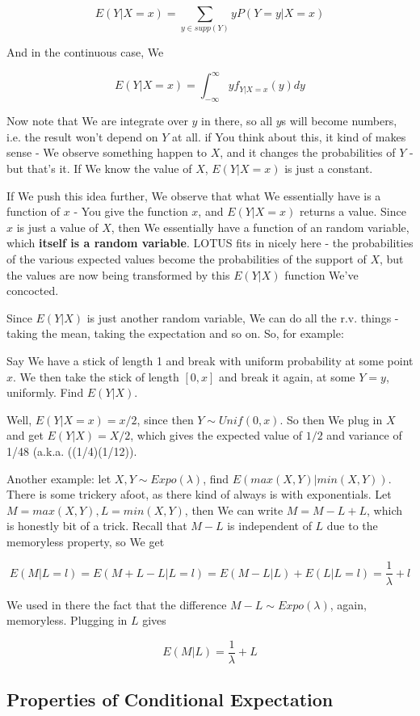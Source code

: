 \documentclass{article}
\begin{document}
		\[ E(Y|X=x) = \sum_{y\in supp(Y)} y P(Y=y|X=x) \]
		
		And in the continuous case, We 

		\[ E(Y|X=x) = \int^\infty_{-\infty} y f_{Y|X=x}(y) dy \]
		
		Now note that We are integrate over $y$ in there, so all $y$s will become numbers, i.e. the result won't depend on $Y$ at all. if You think about this, it kind of makes sense - We observe something happen to $X$, and it changes the probabilities of $Y$ - but that's it. If We know the value of $X$, $E(Y|X=x)$ is just a constant.
		
		If We push this idea further, We observe that what We essentially have is a function of $x$ - You give the function $x$, and $E(Y|X=x)$ returns a value. Since $x$ is just a value of $X$, then We essentially have a function of an random variable, which \textbf{itself is a random variable}. LOTUS fits in nicely here - the probabilities of the various expected values become the probabilities of the support of $X$, but the values are now being transformed by this $E(Y|X)$ function We've concocted.
		
		Since $E(Y|X)$ is just another random variable, We can do all the r.v. things - taking the mean, taking the expectation and so on. So, for example:

		Say We have a stick of length 1 and break with uniform probability at some point $x$. We then take the stick of length $[0, x]$ and break it again, at some $Y=y$, uniformly. Find $E(Y|X)$.
		
		Well, $E(Y|X=x) = x/2$, since then $Y\sim Unif(0, x)$. So then We plug in $X$ and get $E(Y|X) = X/2$, which gives the expected value of $1/2$ and variance of 1/48 (a.k.a. ((1/4)(1/12)).
		
		Another example: let $X, Y\sim Expo(\lambda)$, find $E(max(X, Y)|min(X, Y))$. There is some trickery afoot, as there kind of always is with exponentials. Let $M=max(X, Y), L=min(X, Y)$, then We can write $M = M-L+L$, which is honestly bit of a trick. Recall that $M-L$ is independent of $L$ due to the memoryless property, so We get
		
		\[ E(M|L=l) = E(M+L-L|L=l) = E(M-L|L) + E(L|L=l) = \frac{1}{\lambda} + l  \]

		We used in there the fact that the difference $M-L\sim Expo(\lambda)$, again, memoryless. Plugging in $L$ gives
		
		\[ E(M|L) = \frac{1}{\lambda} + L \]
		
	\subsection{Properties of Conditional Expectation}
	
\end{document}
